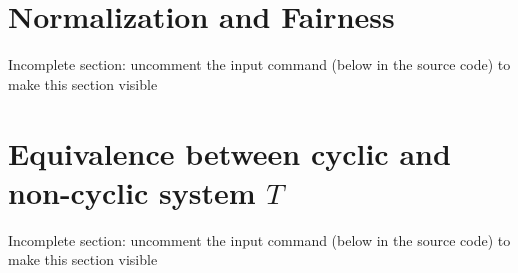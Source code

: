 \documentclass{article}
\begin{document}
\section{Normalization and Fairness}
\label{section-normalization-fairness}
{Incomplete section: uncomment the input command (below in the source code) to make this section visible}
%


\section{Equivalence between cyclic and non-cyclic system $T$} 
\label{section-equivalence-cyclic-non-cyclic-T}
{Incomplete section: uncomment the input command (below in the source code) to make this section visible}
%

%
%
%
%
%
%
%
%
%
\end{document}
